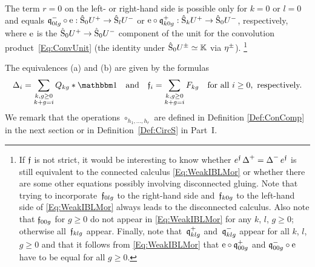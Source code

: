 \documentclass[\MainFolder/Text.tex]{subfiles}
\begin{document}
\begin{Proposition}
\begin{ClaimList}
\begin{enumerate}[label=(\arabic*)]
The term $r=0$ on the left- or right-hand side is possible only for $k=0$ or $l=0$ and equals $\mathfrak{q}_{0lg}^-\circ\mathrm{e}: \hat{\mathrm{S}}_0 U^+ \rightarrow \hat{\mathrm{S}}_l U^-$ or $\mathrm{e}\circ\mathfrak{q}_{k0g}^+: \hat{\mathrm{S}}_k U^+ \rightarrow \hat{\mathrm{S}}_0 U^-$, respectively, where $\mathrm{e}$ is the $\hat{\mathrm{S}}_0 U^+ \rightarrow \hat{\mathrm{S}}_0 U^-$ component of the unit for the convolution product~\eqref{Eq:ConvUnit} (the identity under $\hat{\mathrm{S}}_0 U^{\pm} \simeq \mathbb{K}$ via $\eta^{\pm}$). \footnote{If $\mathfrak{f}$ is not strict, it would be interesting to know whether $e^{\mathfrak{f}} \operatorname{\Delta}^+ = \operatorname{\Delta}^- e^{\mathfrak{f}}$ is still equivalent to the connected calculus \eqref{Eq:WeakIBLMor} or whether there are some other equations possibly involving disconnected gluing. Note that trying to incorporate~$\mathfrak{f}_{0lg}$ to the right-hand side and~$\mathfrak{f}_{k0g}$ to the left-hand side of \eqref{Eq:WeakIBLMor} always leads to the disconnected calculus. Also note that $\mathfrak{f}_{00g}$ for $g\ge 0$ do not appear in \eqref{Eq:WeakIBLMor} for any $k$, $l$, $g\ge 0$; otherwise all~$\mathfrak{f}_{klg}$ appear. Finally, note that~$\mathfrak{q}_{klg}^+$ and~$\mathfrak{q}_{klg}^-$ appear for all $k$, $l$, $g\ge 0$ and that it follows from \eqref{Eq:WeakIBLMor} that $\mathrm{e}\circ\mathfrak{q}_{00g}^+$ and $\mathfrak{q}_{00g}^-\circ\mathrm{e}$ have to be equal for all $g\ge 0$.}
\end{enumerate}
\end{ClaimList}
The equivalences (a) and (b) are given by the formulas
\begin{equation}\label{Eq:FormulasSums}
\BVOp_i = \sum_{\substack{k, g\ge 0 \\k+g=i}} Q_{kg}\Star\Id \quad\text{and}\quad\MVMorF_i = \sum_{\substack{k,g\ge 0\\k+g=i}} F_{kg}\quad\text{for all }i\ge 0,\text{ respectively.}
\end{equation}
We remark that the operations $\circ_{h_1,\dotsc,h_r}$ are  defined in Definition \ref{Def:ConComp} in the next section or in Definition~\ref{Def:CircS} in Part~I.


\end{Proposition}
\end{document}
